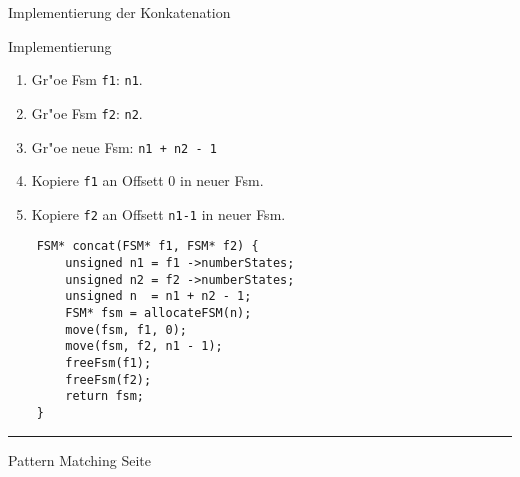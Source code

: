 \begin{slide}{}
\normalsize

\begin{center}
Implementierung der Konkatenation
\end{center}
\vspace*{0.5cm}

\footnotesize
\hspace*{1.3cm} \raisebox{1cm}{Start $\rightarrow$}

Implementierung
\begin{enumerate}
\item Gr"o\3e Fsm \texttt{f1}: \texttt{n1}.
\item Gr"o\3e Fsm \texttt{f2}: \texttt{n2}.
\item Gr"o\3e neue Fsm: \texttt{n1 + n2 - 1}
\item Kopiere \texttt{f1} an Offsett 0 in neuer Fsm.
\item Kopiere \texttt{f2} an Offsett \texttt{n1-1} in neuer Fsm.
\end{enumerate}
\vspace*{0.5cm}

\begin{verbatim}
    FSM* concat(FSM* f1, FSM* f2) {
        unsigned n1 = f1 ->numberStates;
        unsigned n2 = f2 ->numberStates;
        unsigned n  = n1 + n2 - 1;
        FSM* fsm = allocateFSM(n);
        move(fsm, f1, 0);
        move(fsm, f2, n1 - 1);
        freeFsm(f1);
        freeFsm(f2);
        return fsm;
    }
\end{verbatim}

\vspace*{\fill}
\tiny \addtocounter{mypage}{1}
\rule{17cm}{1mm}
Pattern Matching \hspace*{\fill} Seite 
\end{slide}


